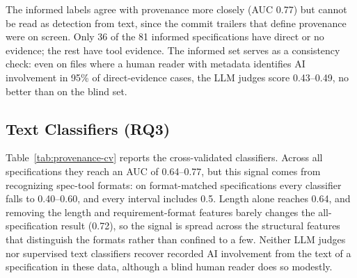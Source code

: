 \documentclass{article}
\begin{document}
The informed labels agree with provenance more closely (AUC 0.77) but cannot be read as detection from text, since the commit trailers that define provenance were on screen. Only 36 of the 81 informed specifications have direct or no evidence; the rest have tool evidence. The informed set serves as a consistency check: even on files where a human reader with metadata identifies AI involvement in 95\% of direct-evidence cases, the LLM judges score 0.43--0.49, no better than on the blind set.

\subsection{Text Classifiers (RQ3)}
Table~\ref{tab:provenance-cv} reports the cross-validated classifiers. Across all specifications they reach an AUC of 0.64--0.77, but this signal comes from recognizing spec-tool formats: on format-matched specifications every classifier falls to 0.40--0.60, and every interval includes 0.5. Length alone reaches 0.64, and removing the length and requirement-format features barely changes the all-specification result (0.72), so the signal is spread across the structural features that distinguish the formats rather than confined to a few. Neither LLM judges nor supervised text classifiers recover recorded AI involvement from the text of a specification in these data, although a blind human reader does so modestly.
\end{document}
